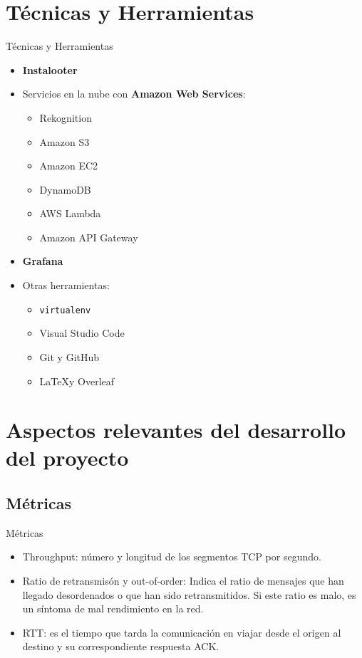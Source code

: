 \documentclass[aspectratio=149]{beamer}
\begin{document}
\section{Técnicas y Herramientas}
\begin{frame}[label=herramientas]{Técnicas y Herramientas}
    \begin{itemize}
        \item \textbf{Instalooter}
        \item Servicios en la nube con \textbf{Amazon Web Services}:
        \begin{itemize}
            \item Rekognition
            \item Amazon S3
            \item Amazon EC2
            \item DynamoDB
            \item AWS Lambda
            \item Amazon API Gateway
        \end{itemize}
        \item \textbf{Grafana}
        \item Otras herramientas:
        \begin{itemize}
            \item \texttt{virtualenv}
            \item Visual Studio Code
            \item Git y GitHub
            \item \LaTeX y Overleaf
        \end{itemize}
    \end{itemize}
\end{frame}

\section{Aspectos relevantes del desarrollo del proyecto}

\subsection{Métricas}
\begin{frame}[label=metricas]{Métricas}
    \begin{itemize}
        \item Throughput: número y longitud de los segmentos TCP por segundo.
        \item Ratio de retransmisón y out-of-order: Indica el ratio de mensajes que han llegado desordenados o que han sido retransmitidos. Si este ratio es malo, es un síntoma de mal rendimiento en la red.
        \item RTT: es el tiempo que tarda la comunicación en viajar desde el origen al destino y su correspondiente respuesta ACK.
    \end{itemize}
\end{frame}
\end{document}
